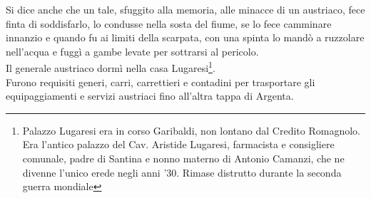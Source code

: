 \documentclass[10pt]{memoir} %
\begin{document}
Si dice anche che un tale, sfuggito alla memoria, alle minacce di un austriaco, fece finta di soddisfarlo, lo condusse nella sosta del fiume, se lo fece camminare innanzio e quando fu ai limiti della scarpata, con una spinta lo mandò a ruzzolare nell'acqua e fuggì a gambe levate per sottrarsi al pericolo.\\
Il generale austriaco dormì nella casa Lugaresi\footnote{Palazzo Lugaresi era in corso Garibaldi, non lontano dal Credito Romagnolo. Era l'antico palazzo del Cav. Aristide Lugaresi, farmacista e consigliere comunale, padre di Santina e nonno materno di Antonio Camanzi, che ne divenne l'unico erede negli anni '30. Rimase distrutto durante la seconda guerra mondiale}.\\
Furono requisiti generi, carri, carrettieri e contadini per trasportare gli equipaggiamenti e servizi austriaci fino all'altra tappa di Argenta.

\end{document}
